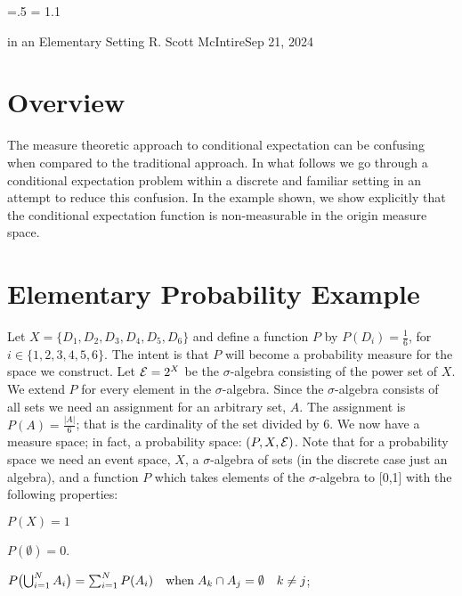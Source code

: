 




\parindent=0pt
\parskip=.5\baselineskip
\baselineskip = 1.1\baselineskip

\footline{\hss\tenrm\folio\hss}

        {in an Elementary Setting}
{R. Scott McIntire}{Sep 21, 2024}

\section{Overview}
The measure theoretic approach to conditional expectation can be confusing
when compared to the traditional approach.
In what follows we go through a conditional 
expectation problem within a discrete and familiar setting in an attempt 
to reduce this confusion. In the example shown, we show explicitly that the 
conditional expectation function is non-measurable in the origin 
measure space.


\section{Elementary Probability Example}
Let $X = \{D_1, D_2, D_3, D_4, D_5, D_6\}$ and define a function $P$ by 
$P(D_i) = \frac{1}{6}$, for $i\in \{1,2,3,4,5,6\}$. The intent is that $P$ will 
become a probability measure for the space we construct.
Let ${\cal E} = 2^X$ be the $\sigma$-algebra 
consisting of the power set of $X$. We extend $P$ for every element in the $\sigma$-algebra.
Since the $\sigma$-algebra consists of all sets 
we need an assignment for an arbitrary set, $A$. 
The assignment is $P(A) = \frac{|A|}{6}$; that is the cardinality of the set divided by 6.
We now have a measure space; in fact, a probability space: $(P,X,{\cal E})$.
Note that for a probability space we need an event space, $X$, a $\sigma$-algebra of sets 
(in the discrete case just an algebra), and a function $P$ which takes 
elements of the $\sigma$-algebra to [0,1] with the following properties:

\beginEnum
\item{$P(X) = 1$}
\item{$P(\emptyset) = 0$.}
\item{$
P\bigl(\mathop{\bigcup}_{i=1}^N A_i\bigr) = \sum_{i=1}^N P(A_i) 
\quad {\rm when}\;  A_k \cap A_j = \emptyset \quad k\neq j
$;}
\endEnum

